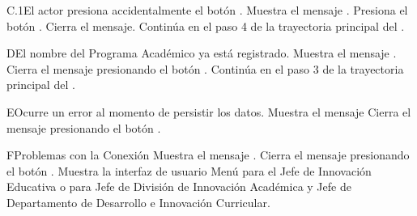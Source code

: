 \begin{UCtrayectoriaA}{C.1}{El actor presiona accidentalmente el botón .}
    \UCpaso Muestra el mensaje .
    \UCpaso[\UCactor] Presiona el botón .
    \UCpaso Cierra el mensaje.
    \UCpaso Continúa en el paso 4 de la trayectoria principal del .
\end{UCtrayectoriaA}


\begin{UCtrayectoriaA}{D}{El nombre del Programa Académico ya está registrado.}
    \UCpaso Muestra el mensaje .
    \UCpaso[\UCactor] Cierra el mensaje presionando el botón .
    \UCpaso Continúa en el paso 3 de la trayectoria principal del .
\end{UCtrayectoriaA}

\begin{UCtrayectoriaA}{E}{Ocurre un error al momento de persistir los datos.}
    \UCpaso Muestra el mensaje 
    \UCpaso[\UCactor] Cierra el mensaje presionando el botón .
\end{UCtrayectoriaA}
\begin{UCtrayectoriaA}{F}{Problemas con la Conexión}
    \UCpaso Muestra el mensaje .
    \UCpaso[\UCactor] Cierra el mensaje presionando el botón .
    \UCpaso Muestra la interfaz de usuario Menú para  el Jefe de Innovación Educativa  o  para Jefe de División de Innovación Académica y Jefe de Departamento de Desarrollo e Innovación Curricular.
\end{UCtrayectoriaA}